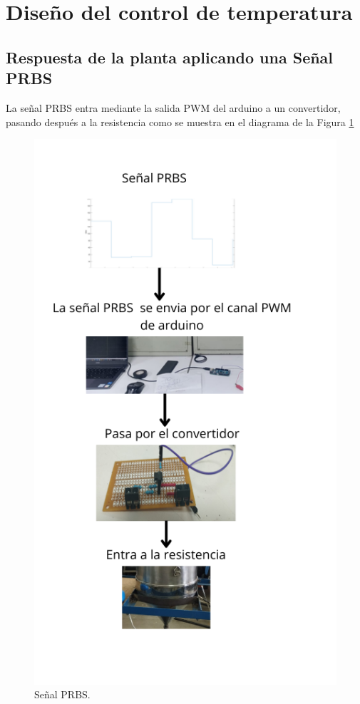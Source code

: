 \documentclass[12pt]{article}
\begin{document}




		
	
	
	\section{Diseño del control de temperatura}
	
	\label{diseño del control de temp}
	
	
	
	\subsection{Respuesta de la planta aplicando una Señal PRBS}
	
	
	La señal PRBS entra  mediante la salida PWM del arduino a un convertidor, pasando después a la resistencia como se muestra en el diagrama de la Figura \ref{ diagrama_prbs}
	
	\begin{figure}[H]
		\centering
		\includegraphics[width=.4\linewidth]{imagenes/diagrama_PRBS}
		\caption{Señal PRBS. }
		\label{ diagrama_prbs}
	\end{figure}
	
\end{document}
